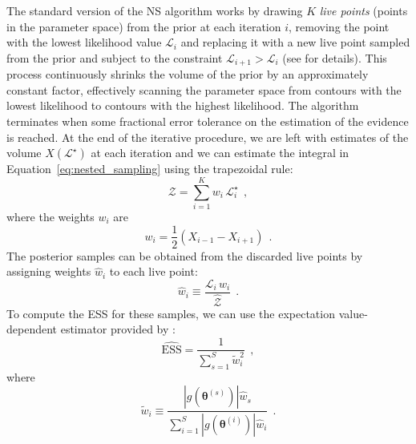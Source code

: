 \documentclass[12pt,dvipsnames]{report}
\renewcommand{\vec}[1]{\boldsymbol{\mathbf{#1}}}
\newcommand{\hquad}{~~}
\begin{document}
The standard version of the NS algorithm works by drawing $K$ \emph{live points} 
(points in the parameter space) from the prior at each iteration $i$, removing 
the point with the lowest likelihood value $\mathcal{L}_i$ and replacing it 
with a new live point sampled from the prior and subject to the 
constraint $\mathcal{L}_{i+1}>\mathcal{L}_i$ (see \citet{arXiv:2205.15570} 
for details). This process continuously shrinks the volume of the prior by an 
approximately constant factor, effectively scanning the parameter space from 
contours with the lowest likelihood to contours with the highest likelihood.
The algorithm terminates when some fractional error tolerance on the estimation 
of the evidence is reached. 
At the end of the iterative procedure, we are left with 
estimates of the volume $X(\mathcal{L}^\star)$ at each iteration and we can 
estimate the integral in Equation~\ref{eq:nested_sampling} using the trapezoidal 
rule:
\begin{equation}
\mathcal{Z}=\sum_{i=1}^{K}w_i\,\mathcal{L}_i^\star
\hquad ,
\end{equation}
where the weights $w_i$ are 
\begin{equation}
w_{i}=\frac{1}{2}\left(X_{i-1}-X_{i+1}\right)
\hquad .
\end{equation}
The posterior samples can be obtained  from the discarded live points 
by assigning weights $\hat{w}_i$ to each live point:
\begin{equation}
    \hat{w}_i\equiv \frac{\mathcal{L}_i\,w_i}{\hat{\mathcal{Z}}}
    \hquad.
    \label{eq:weights_live_points}
\end{equation}
To compute the ESS for these samples, we can use the expectation value-dependent 
estimator provided by \citet{arXiv:1809.04129}:
\begin{equation}
    \widehat{\mathrm{ESS}}=\frac{1}{\sum_{s=1}^S\tilde{w}_i^2}
    \hquad,
\end{equation}
where
\begin{equation}
\tilde{w}_{i}\equiv\frac{\left|g\left(\vec{\theta}^{(s)}\right)\right| \hat w_{s}}{\sum_{i=1}^{S}\left|g\left(\vec{\theta}^{(i)}\right)\right| \hat w_{i}}
\hquad.
\end{equation}
\end{document}
